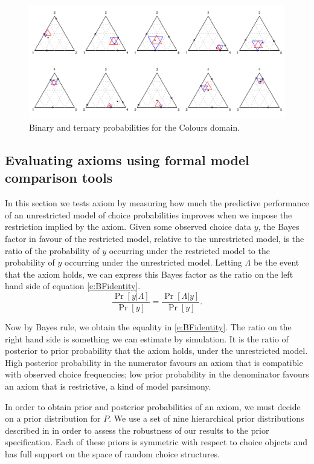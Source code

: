 \documentclass[11pt,letter]{article}
\begin{document}
\begin{figure}
	\caption{Binary and ternary probabilities for the Colours domain.}\label{f:colours}
	\centering
	\includegraphics[width=16cm]{./Population_study_data/Simplexes/Colours.pdf}
\end{figure}

\subsection{Evaluating axioms using formal model comparison tools}

In this section we tests axiom by measuring how much the predictive performance of an unrestricted model of choice probabilities improves when we impose the restriction implied by the axiom.
Given some observed choice data $y$, the Bayes factor in favour of the restricted model, relative to the unrestricted model, is the ratio of the probability of $y$ occurring under the restricted model to the probability of $y$ occurring under the unrestricted model.
Letting $\Lambda$ be the event that the axiom holds, we can express this Bayes factor as the ratio on the left hand side of equation \eqref{e:BFidentity}.
\begin{equation}\label{e:BFidentity}
	\frac{\Pr[y|\Lambda]}{\Pr[y]} = \frac{\Pr[\Lambda|y]}{\Pr[y]}.
\end{equation}

Now by Bayes rule, we obtain the equality in \eqref{e:BFidentity}.
The ratio on the right hand side is something we can estimate by simulation.
It is the ratio of posterior to prior probability that the axiom holds, under the unrestricted model.
High posterior probability in the numerator favours an axiom that is compatible with observed choice frequencies; low prior probability in the denominator favours an axiom that is restrictive, a kind of model parsimony.

In order to obtain prior and posterior probabilities of an axiom, we must decide on a prior distribution for $P$.
We use a set of nine hierarchical prior distributions described in  in order to assess the robustness of our results to the prior specification.
Each of these priors is symmetric with respect to choice objects and has full support on the space of random choice structures.
\end{document}
